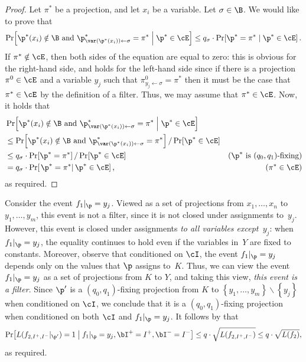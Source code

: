 \documentclass{toc}
\begin{document}
\begin{proof}
Let $\pi^{*}$ be a projection, and let $x_{i}$ be a variable. Let
$\sigma\in\B$. We would like to prove that 
\[
\Pr\!\left[\p^{*}(x_{i})\notin\B\text{ and }\p_{\var(\p^{*}(x_{i}))\gets\sigma}^{*}=\pi^{*}\;\middle|\;\p^{*}\in\cE\right]\le q_{\sigma}\cdot\Pr\!\left[\p^{*}=\pi^{*}\mid\p^{*}\in\cE\right].
\]
If $\pi^{*}\notin\cE$, then both sides of the equation are equal
to zero: this is obvious for the right-hand side, and holds for the
left-hand side since if there is a projection~$\pi^{0}\in\cE$ and
a variable $y_{j}$ such that $\pi_{y_{j}\gets\sigma}^{0}=\pi^{*}$
then it must be the case that $\pi^{*}\in\cE$ by the definition of
a filter. Thus, we may assume that $\pi^{*}\in\cE$. Now, it holds
that 
\begin{align*}
 & \Pr\!\left[\p^{*}(x_{i})\notin\B\text{ and }\p_{\var(\p^{*}(x_{i}))\gets\sigma}^{*}=\pi^{*}\;\middle|\;\p^{*}\in\cE\right]\\
 & \le\Pr\!\left[\p^{*}(x_{i})\notin\B\text{ and }\p_{\var(\p^{*}(x_{i}))\gets\sigma}^{*}=\pi^{*}\right]/\Pr\!\left[\p^{*}\in\cE\right]\\
 & \le q_{\sigma}\cdot\Pr\!\left[\p^{*}=\pi^{*}\right]/\Pr\!\left[\p^{*}\in\cE\right] & \text{(\ensuremath{\p^{*}} is \ensuremath{(q_{0},q_{1})}-fixing)}\\
 & =q_{\sigma}\cdot\Pr\!\left[\left.\p^{*}=\pi^{*}\right|\p^{*}\in\cE\right], & \text{(\ensuremath{\pi^{*}\in\cE})}
\end{align*}
as required. 
\end{proof}
Consider the event $f_{1}|_{\p}=y_{j}$. Viewed as a set of projections
from $x_{1},\ldots,x_{n}$ to $y_{1},\ldots,y_{m}$, this event is
not a filter, since it is not closed under assignments to~$y_{j}$.
However, this event is closed under assignments \emph{to all variables
except~$y_{j}$}: when $f_{1}|_{\p}=y_{j}$, the equality continues
to hold even if the variables in~$Y$ are fixed to constants. Moreover,
observe that conditioned on $\cI$, the event $f_{1}|_{\p}=y_{j}$
depends only on the values that $\p$ assigns to~$K$. Thus, we can
view the event $f_{1}|_{\p}=y_{j}$ as a set of projections from $K$
to $Y$, and taking this view, \emph{this event is a filter}. Since
$\p'$ is a $(q_{0},q_{1})$-fixing projection from $K$ to $\left\{ y_{1},\ldots,y_{m}\right\} \backslash\left\{ y_{j}\right\} $
when conditioned on $\cI$, we conclude that it is a $(q_{0},q_{1})$-fixing
projection when conditioned on both $\cI$ and $f_{1}|_{\p}=y_{j}$.
It follows by  that 
\[
\Pr\!\left[L(f_{2,I^{+},I^{-}}|_{\p'})=1\;\middle|\;f_{1}|_{\p}=y_{j},\bI^{+}=I^{+},\bI^{-}=I^{-}\right]\le q\cdot\sqrt{L(f_{2,I^{+},I^{-}})}\le q\cdot\sqrt{L(f_{2})},
\]
as required.
\end{document}
